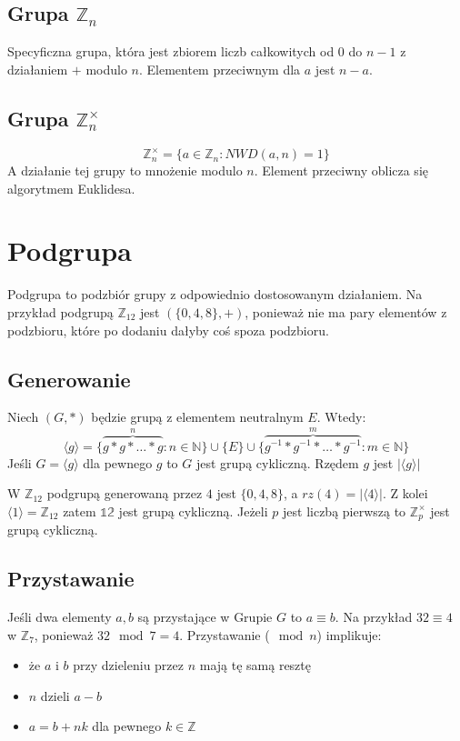 \documentclass{../notatki}
\begin{document}
\subsection{\texorpdfstring{Grupa $\mathbb{Z}_n$}{Grupa Zn}}

Specyficzna grupa, która jest zbiorem liczb całkowitych od $0$ do $n-1$ z
działaniem $+$ modulo $n$. Elementem przeciwnym dla $a$ jest $n - a$.

\subsection{\texorpdfstring{Grupa $\mathbb{Z}_n^\times$}{Grupa Znx}}

$$
\mathbb{Z}_n^\times = \{a \in \mathbb{Z}_n : NWD(a,n) = 1\}
$$
A działanie tej grupy to mnożenie modulo $n$. Element przeciwny oblicza się
algorytmem Euklidesa.

\section{Podgrupa}

Podgrupa to podzbiór grupy z odpowiednio dostosowanym działaniem. Na przykład
podgrupą $\mathbb{Z}_{12}$ jest $(\{0, 4, 8\}, +)$, ponieważ nie
ma pary elementów z
podzbioru, które po dodaniu dałyby coś spoza podzbioru.

\subsection{Generowanie}

Niech $(G, *)$ będzie grupą z elementem neutralnym $E$. Wtedy:
$$
\langle g \rangle = \{\stackrel{n}{\overbrace{g * g * \dots * g}} : n
\in \mathbb{N}\} \cup \{E\} \cup \{\stackrel{m}{\overbrace{g^{-1} * g^{-1} *
  \dots * g^{-1}}} : m
\in \mathbb{N}\}
$$
Jeśli $G = \langle g \rangle$ dla pewnego $g$ to $G$ jest grupą
cykliczną. Rzędem
$g$ jest $|\langle g \rangle|$

W $\mathbb{Z}_{12}$ podgrupą generowaną przez $4$ jest $\{0, 4, 8\}$, a
$rz(4) = |\langle 4 \rangle|$. Z kolei $\langle 1 \rangle = \mathbb{Z}_{12}$
zatem $\mathbb{12}$ jest grupą cykliczną. Jeżeli $p$ jest liczbą pierwszą
to $\mathbb{Z}_p^\times$ jest grupą cykliczną.

\subsection{Przystawanie}

Jeśli dwa elementy $a, b$ są przystające w Grupie $G$ to $a \equiv b$. Na
przykład $32 \equiv 4$ w $\mathbb{Z}_7$, ponieważ $32 \mod 7 = 4$.
Przystawanie ($\mod n$) implikuje:
\begin{itemize}
  \item że $a$ i $b$ przy dzieleniu przez $n$ mają tę samą resztę
  \item $n$ dzieli $a - b$
  \item $a = b + nk$ dla pewnego $k \in \mathbb{Z}$
\end{itemize}
\end{document}
